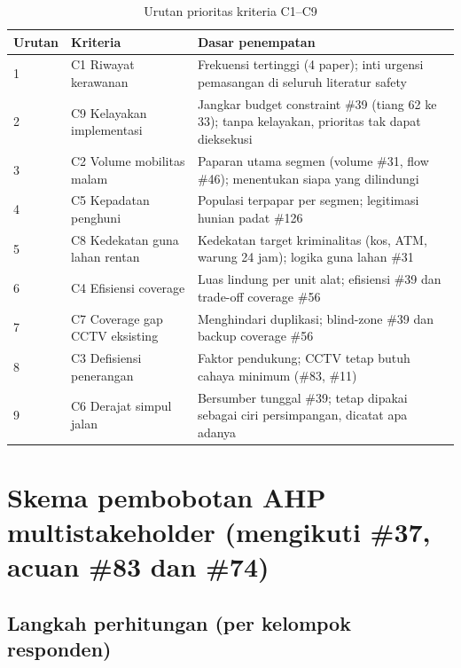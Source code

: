 \documentclass[a4paper,11pt]{article}
\begin{document}
\begin{table}[htbp]
\centering
\begin{tabular}{p{1.2cm}p{3.5cm}p{9.5cm}}
\toprule
\textbf{Urutan} & \textbf{Kriteria} & \textbf{Dasar penempatan} \\
\midrule
1 & C1 Riwayat kerawanan & Frekuensi tertinggi (4 paper); inti urgensi pemasangan di seluruh literatur safety \\
2 & C9 Kelayakan implementasi & Jangkar budget constraint \#39 (tiang 62 ke 33); tanpa kelayakan, prioritas tak dapat dieksekusi \\
3 & C2 Volume mobilitas malam & Paparan utama segmen (volume \#31, flow \#46); menentukan siapa yang dilindungi \\
4 & C5 Kepadatan penghuni & Populasi terpapar per segmen; legitimasi hunian padat \#126 \\
5 & C8 Kedekatan guna lahan rentan & Kedekatan target kriminalitas (kos, ATM, warung 24 jam); logika guna lahan \#31 \\
6 & C4 Efisiensi coverage & Luas lindung per unit alat; efisiensi \#39 dan trade-off coverage \#56 \\
7 & C7 Coverage gap CCTV eksisting & Menghindari duplikasi; blind-zone \#39 dan backup coverage \#56 \\
8 & C3 Defisiensi penerangan & Faktor pendukung; CCTV tetap butuh cahaya minimum (\#83, \#11) \\
9 & C6 Derajat simpul jalan & Bersumber tunggal \#39; tetap dipakai sebagai ciri persimpangan, dicatat apa adanya \\
\bottomrule
\end{tabular}
\caption{Urutan prioritas kriteria C1--C9}
\end{table}

\section{Skema pembobotan AHP multistakeholder (mengikuti \#37, acuan \#83 dan \#74)}

\subsection{Langkah perhitungan (per kelompok responden)}
\end{document}
